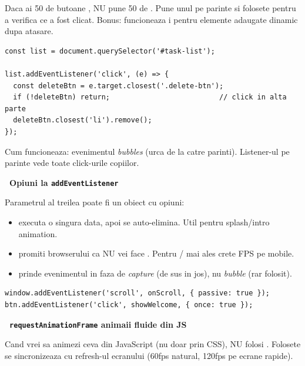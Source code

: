 \begin{bonusbox}
Daca ai 50 de butoane , NU pune 50 de . Pune unul pe parinte si folosete  pentru a verifica ce a fost clicat. Bonus: funcioneaza i pentru elemente adaugate dinamic dupa atasare.

\begin{lstlisting}[style=js, caption={Lista de task-uri cu \u stergere}]
const list = document.querySelector('#task-list');

list.addEventListener('click', (e) => {
  const deleteBtn = e.target.closest('.delete-btn');
  if (!deleteBtn) return;                          // click in alta parte
  deleteBtn.closest('li').remove();
});
\end{lstlisting}

Cum funcioneaza: evenimentul \emph{bubbles} (urca de la  catre parinti). Listener-ul pe parinte vede toate click-urile copiilor.

\medskip

\textbf{\faCog\ Opiuni la \texttt{addEventListener}}

Parametrul al treilea poate fi un obiect cu opiuni:

\begin{itemize}[itemsep=1pt]
  \item {} \textendash{} executa o singura data, apoi se auto-elimina. Util pentru splash/intro animation.
  \item {} \textendash{} promiti browserului ca NU vei face . Pentru / mai ales \textendash{} crete FPS pe mobile.
  \item {} \textendash{} prinde evenimentul in faza de \emph{capture} (de sus in jos), nu \emph{bubble} (rar folosit).
\end{itemize}

\begin{lstlisting}[style=js, numbers=none]
window.addEventListener('scroll', onScroll, { passive: true });
btn.addEventListener('click', showWelcome, { once: true });
\end{lstlisting}

\medskip

\textbf{\faPlay\ \texttt{requestAnimationFrame} \textendash{} animaii fluide din JS}

Cand vrei sa animezi ceva din JavaScript (nu doar prin CSS), NU folosi . Folosete  \textendash{} se sincronizeaza cu refresh-ul ecranului (60fps natural, 120fps pe ecrane rapide).


\end{bonusbox}
